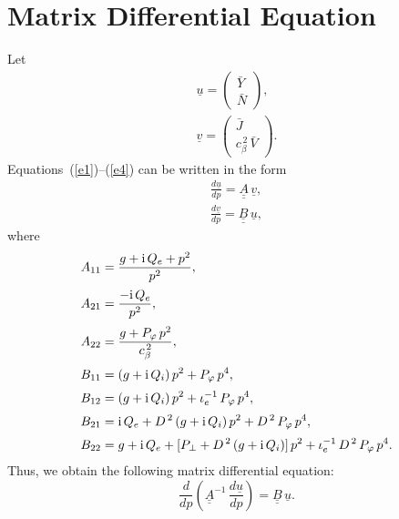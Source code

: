 \documentclass[12pt,prb,aps,notitlepage]{revtex4-1}
\begin{document}
\section{Matrix Differential Equation}
Let
\begin{align}
\underline{u}= \left(\begin{array}{c}\bar{Y}\\\bar{N}\end{array}\right),\\[0.5ex]
\underline{v}= \left(\begin{array}{c}\bar{J}\\c_\beta^{\,2}\,\bar{V}\end{array}\right).
\end{align}
Equations~(\ref{e1})--(\ref{e4}) can be written in the form 
\begin{align}
\frac{d\underline{u}}{dp}= \underline{\underline{A}}\,\underline{v},\\[0.5ex]
\frac{d\underline{v}}{dp}= \underline{\underline{B}}\,\underline{u},
\end{align}
where
\begin{align}
A_{11} &=  \frac{g+{\rm i}\,Q_e+p^2}{p^2},\\[0.5ex]
A_{21} &= \frac{-{\rm i}\,Q_e}{p^2},\\[0.5ex]
A_{22} &= \frac{g + P_\varphi\,p^2}{c_\beta^{\,2}},\\[0.5ex]
B_{11} &= (g+{\rm i}\,Q_i)\,p^2 + P_\varphi\,p^4,\\[0.5ex]
B_{12} &= (g+{\rm i}\,Q_i)\,p^2 + \iota_e^{-1}\,P_\varphi\,p^4,\\[0.5ex]
B_{21}&= {\rm i}\,Q_e+ D^{\,2}\,(g+{\rm i}\,Q_i)\,p^2 + D^{\,2}\,P_\varphi\,p^4,\\[0.5ex]
B_{22} & =g+{\rm i}\,Q_e + [P_\perp + D^{\,2}\,(g + {\rm i}\,Q_i)]\,p^2 + \iota_e^{-1}\,D^{\,2}\,P_\varphi\,p^4.
\end{align}
Thus, we obtain the following matrix differential equation: 
\begin{equation}\label{mat}
\frac{d}{dp}\!\left(\underline{\underline{A}}^{-1}\,\frac{d\underline{u}}{dp}\right) = \underline{\underline{B}}\,\underline{u}.
\end{equation}
\end{document}
